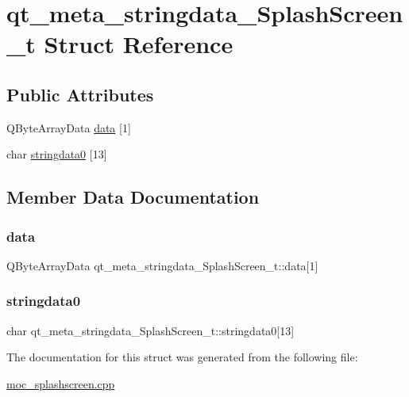 \hypertarget{structqt__meta__stringdata__SplashScreen__t}{}\section{qt\+\_\+meta\+\_\+stringdata\+\_\+\+Splash\+Screen\+\_\+t Struct Reference}
\label{structqt__meta__stringdata__SplashScreen__t}
\subsection*{Public Attributes}
\begin{DoxyCompactItemize}
\item 
Q\+Byte\+Array\+Data \mbox{\hyperlink{structqt__meta__stringdata__SplashScreen__t_a723d026e345cd64a4eb76cbf2bccbe50}{data}} \mbox{[}1\mbox{]}
\item 
char \mbox{\hyperlink{structqt__meta__stringdata__SplashScreen__t_aa78ee3331dcf27ae2ee3131434a3f3ce}{stringdata0}} \mbox{[}13\mbox{]}
\end{DoxyCompactItemize}


\subsection{Member Data Documentation}
\mbox{\label{structqt__meta__stringdata__SplashScreen__t_a723d026e345cd64a4eb76cbf2bccbe50}} 
\subsubsection{\texorpdfstring{data}{data}}
{\footnotesize\ttfamily Q\+Byte\+Array\+Data qt\+\_\+meta\+\_\+stringdata\+\_\+\+Splash\+Screen\+\_\+t\+::data\mbox{[}1\mbox{]}}

\mbox{\label{structqt__meta__stringdata__SplashScreen__t_aa78ee3331dcf27ae2ee3131434a3f3ce}} 
\subsubsection{\texorpdfstring{stringdata0}{stringdata0}}
{\footnotesize\ttfamily char qt\+\_\+meta\+\_\+stringdata\+\_\+\+Splash\+Screen\+\_\+t\+::stringdata0\mbox{[}13\mbox{]}}



The documentation for this struct was generated from the following file\+:\begin{DoxyCompactItemize}
\item 
\mbox{\hyperlink{moc__splashscreen_8cpp}{moc\+\_\+splashscreen.\+cpp}}\end{DoxyCompactItemize}
